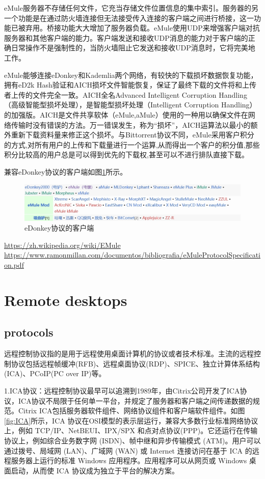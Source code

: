 \documentclass[a4paper,twoside]{scrbook}
\begin{document}
\begin{CJK}{UTF8}{gbsn}
eMule服务器不存储任何文件，它充当存储文件位置信息的集中索引。服务器的另一个功能是在通过防火墙连接但无法接受传入连接的客户端之间进行桥接，这一功能已被弃用。桥接功能大大增加了服务器负载。eMule使用UDP来增强客户端对抗服务器和其他客户端的能力。客户端发送和接收UDP消息的能力对于客户端的正确日常操作不是强制性的，当防火墙阻止它发送和接收UDP消息时，它将完美地工作。

eMule能够连接eDonkey和Kademlia两个网络，有较快的下载损坏数据恢复功能，拥有eD2k Hash验证和AICH损坏文件智能恢复，保证了最终下载的文件将和上传者上传的文件完全一致。AICH全名Advanced Intelligent Corruption Handling（高级智能型损坏处理），是智能型损坏处理（Intelligent Corruption Handling）的加强版。AICH是文件共享软体（eMule,aMule）使用的一种用以确保文件在网络传输时没有错误的方法。万一错误发生，称为“损坏”，AICH运算法以最小的额外重新下载资料量来修正这个损坏。与Bittorrent协议不同，eMule采用客户积分的方式,对所有用户的上传和下载量进行一个运算,从而得出一个客户的积分值,那些积分比较高的用户总是可以得到优先的下载权,甚至可以不进行排队直接下载。

兼容eDonkey协议的客户端如图\ref{fig:eDonkey}所示。
\begin{figure}[!htbp]
\centering
\includegraphics[width=1\textwidth]{Figures/eDonkey.png}
\caption{eDonkey协议的客户端}
\label{fig:eDonkey}
\end{figure}

\url{https://zh.wikipedia.org/wiki/EMule}
\url{https://www.ramonmillan.com/documentos/bibliografia/eMuleProtocolSpecification.pdf}

\section{Remote desktops}
\subsection{protocols}
远程控制协议指的是用于远程使用桌面计算机的协议或者技术标准。主流的远程控制协议包括远程帧缓冲(RFB)、远程桌面协议(RDP)、SPICE、独立计算体系结构(ICA)、PCoIP(PC over IP)等。

1.ICA协议：远程控制协议最早可以追溯到1989年，由Citrix公司开发了ICA协议，ICA协议不局限于任何单一平台，并规定了服务器和客户端之间传递数据的规范。Citrix ICA包括服务器软件组件、网络协议组件和客户端软件组件。如图\ref{fig:ICA}所示，ICA 协议在OSI模型的表示层运行，兼容大多数行业标准网络协议上，例如 TCP/IP、NetBEUI、IPX/SPX 和点对点协议(PPP)。它还运行在传输协议上，例如综合业务数字网 (ISDN)、帧中继和异步传输模式 (ATM)。用户可以通过拨号、局域网 (LAN)、广域网 (WAN) 或 Internet 连接访问在基于 ICA 的远程服务器上运行的标准 Windows 应用程序。应用程序可以从网页或 Windows 桌面启动，从而使 ICA 协议成为独立于平台的解决方案。


\end{CJK}
\end{document}
